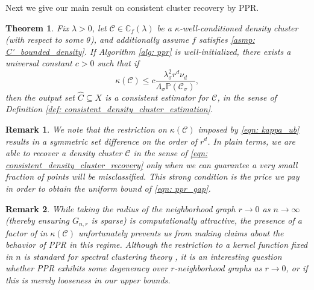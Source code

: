 \documentclass{article}
\newcommand{\1}{\mathbf{1}}
\newcommand{\Xbf}{X}             %
\newcommand{\Pbb}{\mathbb{P}}
\newcommand{\Cbb}{\mathbb{C}}
\newcommand{\Cset}{\mathcal{C}}
\newcommand{\Csig}{\Cset_{\sigma}}
\newcommand{\Cest}{\widehat{C}}
\theoremstyle{aldenthm}
\newtheorem{theorem}{Theorem}
\theoremstyle{aldenrmrk}
\newtheorem{remark}{Remark}
\begin{document}
Next we give our main result on consistent cluster recovery by PPR.

\begin{theorem}
  \label{thm: consistent_recovery_of_density_clusters}
  Fix $\lambda > 0$, let $\Cset \in \Cbb_f(\lambda)$ be a
  $\kappa$-well-conditioned density cluster (with respect to some $\theta$), and
  additionally assume $f$ satisfies \ref{asmp: C'_bounded_density}. If Algorithm
  \ref{alg: ppr} is well-initialized, there exists a universal constant $c >  0$
  such that if  
  \begin{equation}
    \label{eqn: kappa_ub}
    \kappa(\Cset) \leq c \frac{\lambda_{\sigma}^2r^d
      \nu_d}{\Lambda_{\sigma}\Pbb(\Csig)}, 
  \end{equation}
  then the output set $\Cest \subseteq \Xbf$ is a consistent estimator for
  $\Cset$, in the sense of Definition \ref{def: consistent_density_cluster_estimation}. 
\end{theorem}

\begin{remark}
  We note that the restriction on $\kappa(\Cset)$ imposed by \eqref{eqn:
    kappa_ub} results in a symmetric set difference \smash{$\Delta(\Csig[\Xbf],
    \Cest)$} on the order of $r^d$. In plain terms, we are able to recover a
  density cluster $\Cset$ in the sense of \eqref{eqn:
    consistent_density_cluster_recovery} only when we can guarantee a very small
  fraction of points will be misclassified. This strong condition is the price
  we pay in order to obtain the uniform bound of \eqref{eqn: ppr_gap}. 
\end{remark}

\begin{remark}
  While taking the radius of the neighborhood graph $r \to 0$ as $n \to
  \infty$ (thereby ensuring $G_{n,r}$ is sparse) is computationally
  attractive, the presence of a factor of  in
  $\kappa(\Cset)$ unfortunately prevents us from making claims about the
  behavior of PPR in this regime. Although the restriction to a kernel
  function fixed in $n$ is standard for spectral clustering theory
  \citep{schiebinger2015,vonluxburg2008}, it is an interesting question whether
  PPR exhibits some degeneracy over $r$-neighborhood graphs as $r \to 0$, or if
  this is merely looseness in our upper bounds.  
\end{remark}
\end{document}
